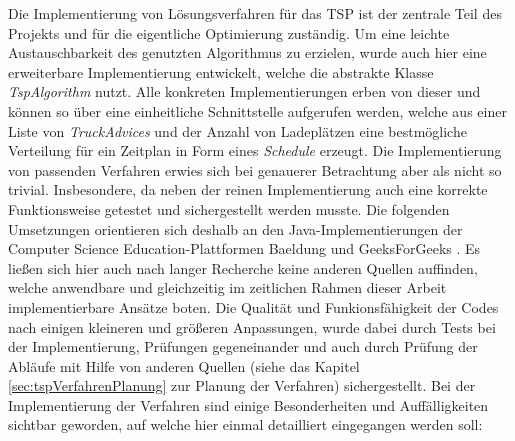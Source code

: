 Die Implementierung von Lösungsverfahren für das TSP ist der zentrale Teil des Projekts und für die eigentliche Optimierung zuständig. Um eine leichte Austauschbarkeit des genutzten Algorithmus zu erzielen, wurde auch hier eine erweiterbare Implementierung entwickelt, welche die abstrakte Klasse \textit{TspAlgorithm} nutzt. Alle konkreten Implementierungen erben von dieser und können so über eine einheitliche Schnittstelle aufgerufen werden, welche aus einer Liste von \textit{TruckAdvices} und der Anzahl von Ladeplätzen eine bestmögliche Verteilung für ein Zeitplan in Form eines \textit{Schedule} erzeugt. Die Implementierung von passenden Verfahren erwies sich bei genauerer Betrachtung aber als nicht so trivial. Insbesondere, da neben der reinen Implementierung auch eine korrekte Funktionsweise getestet und sichergestellt werden musste. Die folgenden Umsetzungen orientieren sich deshalb an den Java-Implementierungen der Computer Science Education-Plattformen Baeldung \cite{baeldung} und GeeksForGeeks \cite{geeksForGeeks}. Es ließen sich hier auch nach langer Recherche keine anderen Quellen auffinden, welche anwendbare und gleichzeitig im zeitlichen Rahmen dieser Arbeit implementierbare Ansätze boten. Die Qualität und Funkionsfähigkeit der Codes nach einigen kleineren und größeren Anpassungen, wurde dabei durch Tests bei der Implementierung, Prüfungen gegeneinander und auch durch Prüfung der Abläufe mit Hilfe von anderen Quellen (siehe das Kapitel \ref{sec:tspVerfahrenPlanung} zur Planung der Verfahren) sichergestellt. Bei der Implementierung der Verfahren sind einige Besonderheiten und Auffälligkeiten sichtbar geworden, auf welche hier einmal detailliert eingegangen werden soll:

